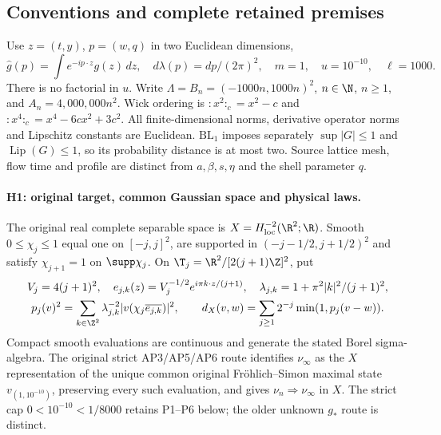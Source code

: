 \subsection{Conventions and complete retained premises}
Use $z=(t,y)$, $p=(w,q)$ in two Euclidean dimensions,
\[
 \hat g(p)=\int e^{-ip\cdot z}g(z)\,dz,\quad
 d\lambda(p)=dp/(2\pi)^2,\quad m=1,\quad u=10^{-10},\quad\ell=1000.
\]
There is no factorial in $u$. Write $\Lambda=B_n=(-1000n,1000n)^2$,
$n\in\N$, $n\ge1$, and $A_n=4{,}000{,}000n^2$.
Wick ordering is $:x^2:_c=x^2-c$ and $:x^4:_c=x^4-6cx^2+3c^2$.
All finite-dimensional norms, derivative operator norms and Lipschitz
constants are Euclidean. $\mathrm{BL}_1$ imposes separately
$\sup|G|\le1$ and $\operatorname{Lip}(G)\le1$, so its probability distance
is at most two. Source lattice mesh, flow time and profile are distinct
from $a,\beta,s,\eta$ and the shell parameter $q$.

\paragraph{H1: original target, common Gaussian space and physical laws.}
The original real complete separable space is
$X=H^{-2}_{\mathrm{loc}}(\R^2;\R)$. Smooth $0\le\chi_j\le1$ equal one
on $[-j,j]^2$, are supported in $(-j-1/2,j+1/2)^2$ and satisfy
$\chi_{j+1}=1$ on $\supp\chi_j$. On $\T_j=\R^2/[2(j+1)\Z]^2$, put
\begin{gather*}
 V_j=4(j+1)^2,\quad e_{j,k}(z)=V_j^{-1/2}e^{i\pi k\cdot z/(j+1)},\quad
 \lambda_{j,k}=1+\pi^2|k|^2/(j+1)^2,\\
 p_j(v)^2=\sum_{k\in\Z^2}\lambda_{j,k}^{-2}
       |v(\chi_j\overline{e_{j,k}})|^2,\qquad
 d_X(v,w)=\sum_{j\ge1}2^{-j}\min(1,p_j(v-w)).
\end{gather*}
Compact smooth evaluations are continuous and generate the stated Borel
sigma-algebra. The original strict AP3/AP5/AP6 route identifies
$\nu_\infty$ as the $X$ representation of the unique common original
Fr\"ohlich--Simon maximal state $v_{(1,10^{-10})}$, preserving every such
evaluation, and gives $\nu_n\Rightarrow\nu_\infty$ in $X$.
The strict cap $0<10^{-10}<1/8000$ retains P1--P6 below; the older unknown
$g_*$ route is distinct.

